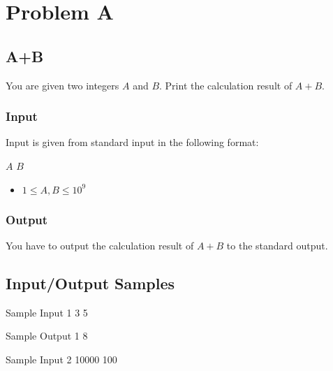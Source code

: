 \documentclass[11pt,a4paper]{article}
\begin{document}
\section{Problem A}

\subsection{A+B}

You are given two integers $A$ and $B$. Print the calculation result of $A + B$.

\subsubsection{Input}

Input is given from standard input in the following format:

\begin{screen}
$A$ $B$
\end{screen}

\begin{itemize}
    \item $1 \leq A, B \leq 10^{9}$
\end{itemize}

\subsubsection{Output}

You have to output the calculation result of $A + B$ to the standard output.


\subsection{ Input/Output Samples }



\begin{itembox}[l]{ Sample Input 1 }
3 5

\end{itembox}



\begin{itembox}[l]{ Sample Output 1 }
8

\end{itembox}







\begin{itembox}[l]{ Sample Input 2 }
10000 100

\end{itembox}
\end{document}
